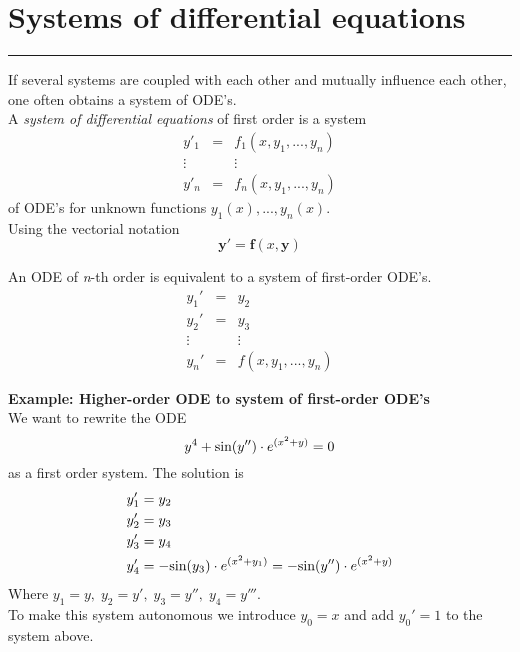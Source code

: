 \section{Systems of differential equations}
\noindent\rule[\linienAbstand]{\linewidth}{\linienDickeDick}
If several systems are coupled with each other and mutually influence each other, one often obtains a system of ODE’s.\\
A \emph{system of differential equations} of first order is a system
\begin{equation}
  \begin{matrix}
    y'_1 & = & f_1(x, y_1,...,y_n)\\
    \vdots & & \vdots \;\;\;\;\; \; \; \; \; \; \; \; \; \; \; \; \; \; \\
    y'_n & = & f_n(x, y_1,...,y_n)
\end{matrix}
\end{equation}
of ODE’s for unknown functions $y_1(x), ... , y_n(x)$.\\
Using the vectorial notation
\begin{equation}
  \mathbf{y}' = \mathbf{f}(x, \mathbf{y})
\end{equation}

An ODE of \emph{n}-th order is equivalent to a system of first-order ODE's.
\begin{equation}
  \begin{matrix}
    y_1' & = & y_2\\
    y_2' & = & y_3\\
    \vdots  &  & \vdots \\
    y_n' & = & f(x, y_1, ..., y_n)
  \end{matrix}
\end{equation}

\textbf{Example: Higher-order ODE to system of first-order ODE's}\\
We want to rewrite the ODE
\begin{equation}
  y^4 + \textup{sin}(y'') \cdot e^{(x^2 + y)} = 0
\end{equation}
as a first order system. The solution is
\begin{equation}
  \begin{split}
    y_1' &= y_2\\
    y_2' &= y_3\\
    y_3' &= y_4 \\
    y_4' &= - \textup{sin}(y_3) \cdot e^{(x^2 + y_1)} = - \textup{sin}(y'') \cdot e^{(x^2 + y)}
  \end{split}
\end{equation}
Where $y_1 = y,\; y_2 = y',\; y_3 = y'',\; y_4 = y'''$.\\
To make this system autonomous we introduce $y_0 = x$ and add $y_0' = 1$ to the system above.\\

